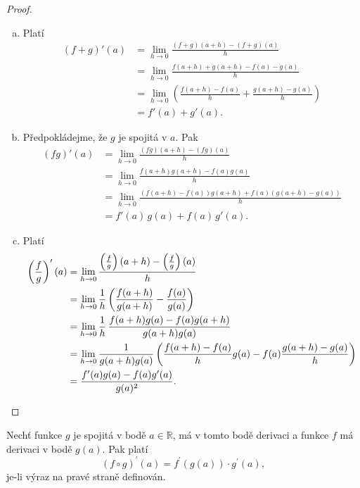 \begin{proof}\,
\begin{enumerate}[(a)]
	\item Platí
	\begin{align*}
	(f+g)'(a) & = \lim_{h\to 0} \frac{(f+g)(a+h)-(f+g)(a)}{h}\\
	&= \lim_{h\to 0} \frac{f(a+h)+g(a+h)-f(a)-g(a)}{h}\\
	&= \lim_{h\to 0} \left( \frac{f(a+h)-f(a)}{h} + \frac{g(a+h)-g(a)}{h} \right)\\
 &= f'(a) + g'(a).
\end{align*}
\item Předpokládejme, že $g$ je spojitá v $a$. Pak
\begin{align*}
(fg)'(a) &= \lim_{h\to 0} \frac{(fg)(a+h)-(fg)(a)}{h}\\
&= \lim_{h\to 0} \frac{f(a+h)g(a+h)-f(a)g(a)}{h}\\
&= \lim_{h\to 0} \frac{(f(a+h)-f(a))g(a+h)+f(a)(g(a+h)-g(a))}{h}\\
&= f'(a)\,g(a) + f(a)\,g'(a).
\end{align*}
\item Platí
\begin{align*}
\left(\frac{f}{g}\right)'(a) &= \lim_{h\to 0} \frac{\left( \frac{f}{g} \right ) (a+h)-\left( \frac{f}{g} \right ) (a)}{h}\\
	&= \lim_{h\to 0} \frac{1}{h}\left( \frac{f(a+h)}{g(a+h)} - \frac{f(a)}{g(a)} \right)\\
	&= \lim_{h\to 0} \frac{1}{h}\,\frac{f(a+h)g(a)-f(a)g(a+h)}{g(a+h)g(a)}\\
	&= \lim_{h\to 0} \frac{1}{g(a+h)g(a)}\left( \frac{f(a+h)-f(a)}{h}g(a) - f(a)\frac{g(a+h)-g(a)}{h} \right)\\
	&= \frac{f'(a)g(a)-f(a)g'(a)}{g(a)^2}.\qedhere
\end{align*}
\end{enumerate}
\end{proof}

\begin{veta} \label{veta5.3}
	Nechť funkce $g$ je spojitá v bodě $a \in \mathbb R$, má v tomto bodě derivaci
	a funkce $f$ má derivaci v bodě $g(a)$. Pak platí
	$$
	    (f\circ g)^\prime(a) = f^\prime(g(a))\cdot g^\prime(a),
	$$
	je-li výraz na pravé straně definován.
\end{veta}

